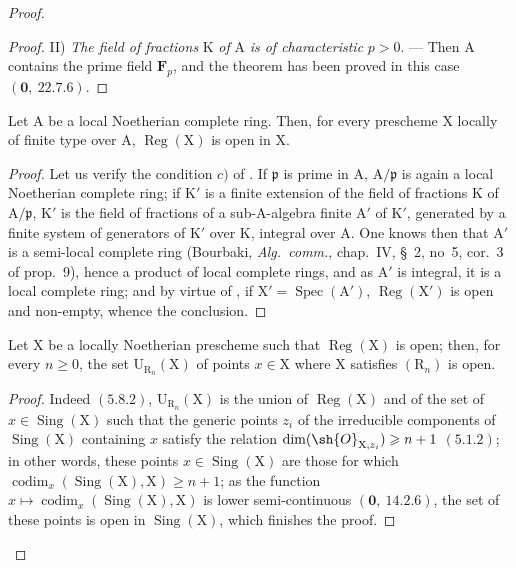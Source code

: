 \begin{proof}
\begin{proof}
II) \emph{The field of fractions} $\mathrm{K}$ \emph{of} $\mathrm{A}$ \emph{is of characteristic} $p>0$. --- Then $\mathrm{A}$ contains the
prime field $\mathbf{F}_p$, and the theorem has been proved in this case $(\mathbf{0},~22.7.6)$.
\end{proof}

\begin{corollary}[6.12.8]
\label{IV.6.12.8}
Let $\mathrm{A}$ be a local Noetherian complete ring. Then, for every
prescheme $\mathrm{X}$ locally of finite type over $\mathrm{A}$, $\operatorname{Reg}(\mathrm{X})$ is open in $\mathrm{X}$.
\end{corollary}

\begin{proof}
Let us verify the condition $c)$ of . If $\mathfrak{p}$ is prime in $\mathrm{A}$, $\mathrm{A}/\mathfrak{p}$ is again a
local Noetherian complete ring; if $\mathrm{K}'$ is a finite extension of the field of fractions $\mathrm{K}$
of $\mathrm{A}/\mathfrak{p}$, $\mathrm{K}'$ is the field of fractions of a sub-$\mathrm{A}$-algebra finite $\mathrm{A}'$ of $\mathrm{K}'$, generated by
a finite system of generators of $\mathrm{K}'$ over $\mathrm{K}$, integral over $\mathrm{A}$. One knows then that $\mathrm{A}'$ is a
semi-local complete ring (Bourbaki, \emph{Alg.~comm.}, chap.~IV, \S~2, no~5, cor.~3 of prop.~9), hence
a product of local complete rings, and as $\mathrm{A}'$ is integral, it is a local
complete ring; and by virtue of , if $\mathrm{X}'=\operatorname{Spec}(\mathrm{A}')$, $\operatorname{Reg}(\mathrm{X}')$ is open and non-empty,
whence the conclusion.
\end{proof}

\begin{proposition}[6.12.9]
\label{IV.6.12.9}
Let $\mathrm{X}$ be a locally Noetherian prescheme such that $\operatorname{Reg}(\mathrm{X})$ is
open; then, for every $n\geqslant 0$, the set $\mathrm{U}_{\mathrm{R}_n}(\mathrm{X})$ of points $x\in\mathrm{X}$ where $\mathrm{X}$ satisfies $(\mathrm{R}_n)$ is open.
\end{proposition}

\begin{proof}
Indeed $(5.8.2)$, $\mathrm{U}_{\mathrm{R}_n}(\mathrm{X})$ is the union of $\operatorname{Reg}(\mathrm{X})$ and of the set of $x\in\operatorname{Sing}(\mathrm{X})$
such that the generic points $z_i$ of the irreducible components of $\operatorname{Sing}(\mathrm{X})$ containing $x$
satisfy the relation $\dim(\sh{O}_{\mathrm{X},z_i})\geqslant n+1$ $(5.1.2)$; in other words, these
points $x\in\operatorname{Sing}(\mathrm{X})$ are those for which $\operatorname{codim}_x(\operatorname{Sing}(\mathrm{X}),\mathrm{X})\geqslant n+1$;
as the function $x\mapsto\operatorname{codim}_x(\operatorname{Sing}(\mathrm{X}),\mathrm{X})$ is lower semi-continuous $(\mathbf{0},~14.2.6)$,
the set of these points is open in $\operatorname{Sing}(\mathrm{X})$, which finishes the proof.
\end{proof}


\end{proof}
